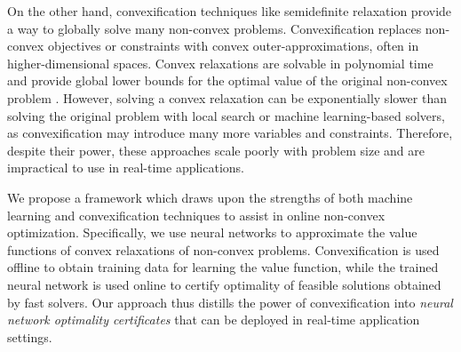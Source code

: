 \documentclass[10pt]{article} %
\theoremstyle{plain}
\theoremstyle{definition}
\theoremstyle{remark}
\begin{document}
On the other hand, convexification techniques like semidefinite relaxation provide a way to globally solve many non-convex problems. Convexification replaces non-convex objectives or constraints with convex outer-approximations, often in higher-dimensional spaces. Convex relaxations are solvable in polynomial time and provide global lower bounds for the optimal value of the original non-convex problem \citep{boyd2004convex}. 
However, solving a convex relaxation can be exponentially slower than solving the original problem with local search or machine learning-based solvers, as convexification may introduce many more variables and constraints. Therefore, despite their power, these approaches scale poorly with problem size and are impractical to use in real-time applications.

We propose a framework which draws upon the strengths of both machine learning and convexification techniques to assist in online non-convex optimization. Specifically, we use neural networks to approximate the value functions of convex relaxations of non-convex problems. Convexification is used offline to obtain training data for learning the value function, while the trained neural network is used online to certify optimality of feasible solutions obtained by fast solvers. Our approach thus distills the power of convexification into \textit{neural network optimality certificates} that can be deployed in real-time application settings.


\end{document}
